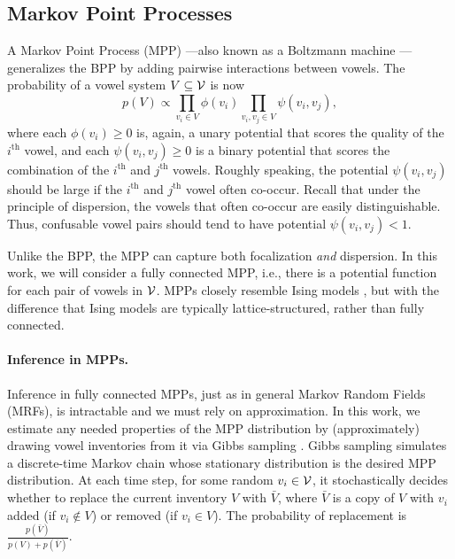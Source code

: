 \documentclass[11pt,a4paper]{article}
\renewcommand{\cite}[2][]{\citep[#1]{#2}}
\begin{document}
\subsection{Markov Point Processes}
A Markov Point Process (MPP) \cite{opac-b1101505}---also known as a Boltzmann machine  \cite{ackley1985learning,pdp1986}---generalizes the BPP by adding pairwise interactions between vowels. The probability of
a vowel system $V \subseteq {\cal V}$ is now
\begin{equation}\label{eq:mpp}
  p(V) \propto \prod_{v_i \in V} \phi(v_i) \prod_{ v_i, v_j \in V} \psi(v_i, v_j),
\end{equation}
where each $\phi(v_i) \geq 0$ is, again, a unary potential that scores the
quality of the $i^\text{th}$ vowel, and each $\psi(v_i, v_j) \geq 0$ is a binary potential
that scores the combination of the $i^{\text{th}}$ and $j^{\text{th}}$
vowels. Roughly speaking, the potential $\psi(v_i, v_j)$ should be large if
the $i^{\text{th}}$ and $j^{\text{th}}$ vowel often co-occur.
Recall that under the principle of dispersion, the vowels that often co-occur
are easily distinguishable.  Thus, confusable vowel pairs
should tend to have potential $\psi(v_i, v_j) < 1$.

Unlike the BPP, the MPP can capture both focalization {\em and} dispersion. In this work, we will consider a fully connected MPP, i.e., there is a potential function for each pair of vowels in $\cal V$.  MPPs closely resemble Ising models \cite{ising1925beitrag}, but with the difference that Ising models are typically lattice-structured, rather than fully connected.

\paragraph{Inference in MPPs.}
Inference in fully connected MPPs, just as in general Markov Random
Fields (MRFs), is
intractable \cite{cooper1990computational} and we must rely on
approximation. In this work, we estimate any needed properties of the MPP
distribution by (approximately) drawing vowel inventories from it via Gibbs 
sampling
\cite{geman1984stochastic,Robert:2005:MCS:1051451}.
Gibbs sampling simulates a discrete-time Markov chain whose
stationary distribution is the desired MPP distribution.  
At each time step, for some random $v_i \in {\cal V}$, 
it stochastically decides whether to replace the current inventory $V$ with
$\bar{V}$, where $\bar{V}$ is a copy of $V$ with $v_i$ added (if $v_i
\notin V$) or removed (if $v_i \in V$).  The probability of replacement is
$\frac{p(\bar{V})}{p(V)+p(\bar{V})}$.  
\end{document}
